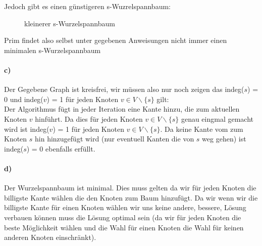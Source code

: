 \documentclass[a4paper]{article}
\begin{document}
Jedoch gibt es einen günstigeren s-Wuzrelspannbaum:
\begin{figure}[H]
    \centering
    \caption{kleinerer s-Wurzelspannbaum}
\end{figure}
Prim findet also selbst unter gegebenen Anweisungen nicht immer einen minimalen s-Wurzelspannbaum
\paragraph*{c)}
Der Gegebene Graph ist kreisfrei, wir müssen also nur noch zeigen das indeg($s$) = 0 und 
indeg($v$) = 1 für jeden Knoten $v \in V \backslash \{s\}$ gilt: \\
Der Algorithmus fügt in jeder Iteration eine Kante hinzu, die zum aktuellen Knoten $v$
hinführt. Da dies für jeden Knoten $v \in V \backslash \{s\}$ genau eingmal gemacht wird ist 
indeg($v$) = 1 für jeden Knoten $v \in V \backslash \{s\}$. Da keine Kante vom zum Knoten 
$s$ hin hinzugefügt wird (nur eventuell Kanten die von $s$ weg gehen) ist indeg($s$) = 0
ebenfalls erfüllt.
\paragraph*{d)}  
Der Wurzelspannbaum ist minimal. Dies muss gelten da wir für jeden Knoten die billigste Kante 
wählen die den Knoten zum Baum hinzufügt. Da wir wenn wir die billigste Kante für einen Knoten
wählen wir uns keine andere, bessere, Lösung verbauen können muss die Lösung optimal sein (da 
wir für jeden Knoten die beste Möglichkeit wählen und die Wahl für einen Knoten die Wahl für
keinen anderen Knoten einschränkt).
\end{document}
